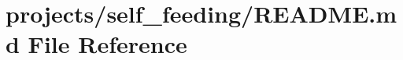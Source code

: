 \hypertarget{projects_2self__feeding_2README_8md}{}\section{projects/self\+\_\+feeding/\+R\+E\+A\+D\+ME.md File Reference}
\label{projects_2self__feeding_2README_8md}
